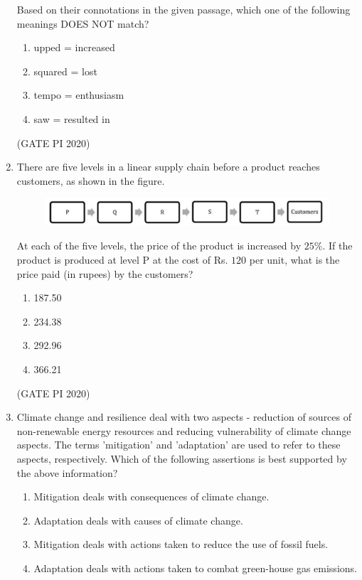 \documentclass[journal,12pt,onecolumn]{IEEEtran}
\theoremstyle{remark}
\begin{document}
\begin{enumerate}
Based on their connotations in the given passage, which one of the following meanings DOES NOT match?
\begin{enumerate}
    \item upped = increased
    \item squared = lost
    \item tempo = enthusiasm
    \item saw = resulted in
\end{enumerate}

\hfill (GATE PI 2020)

\item
There are five levels  in a linear supply chain before a product reaches customers, as shown in the figure.


\begin{figure}[h]
    \centering
    \includegraphics[width=0.5\columnwidth]{figs/fig1.png}
    \caption{}
    \label{fig:placeholder}
\end{figure} 



At each of the five levels, the price of the product is increased by $25\%$. If the product is produced at level P at the cost of Rs. $120$ per unit, what is the price paid (in rupees) by the customers?
\begin{enumerate}
    \item 187.50
    \item 234.38
    \item 292.96
    \item 366.21
\end{enumerate}

\hfill (GATE PI 2020)

\item Climate change and resilience deal with two aspects \-- reduction of sources of non-renewable energy resources and reducing vulnerability of climate change aspects. The terms 'mitigation' and 'adaptation' are used to refer to these aspects, respectively.
Which of the following assertions is best supported by the above information?
\begin{enumerate}
    \item Mitigation deals with consequences of climate change.
    \item Adaptation deals with causes of climate change.
    \item Mitigation deals with actions taken to reduce the use of fossil fuels.
    \item Adaptation deals with actions taken to combat green-house gas emissions.
\end{enumerate}


\end{enumerate}
\end{document}

